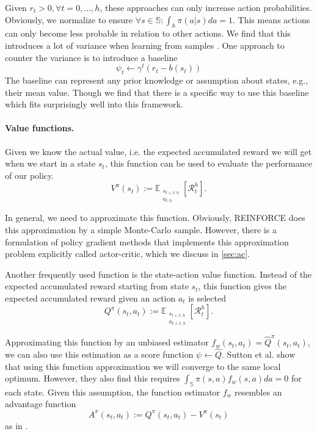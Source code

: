 Given $r_t > 0, \forall t=0,\dots,h$, these approaches can only increase action probabilities. 
Obviously, we normalize to ensure $\forall s \in \mathbb{S}: \int_\mathbb{A}{\pi(a|s)da} = 1$. 
This means actions can only become less probable in relation to other actions. 
We find that this introduces a lot of variance when learning from samples \cite{Sutton:1999:PGM:3009657.3009806}. 
One approach to counter the variance is to introduce a baseline
\begin{equation}
  \psi_t \leftarrow \gamma^{t} (r_{t} - b(s_t))
\end{equation}
The baseline can represent any prior knowledge or assumption about states, e.g., their mean value. 
Though we find that there is a specific way to use this baseline which fits surprisingly well into this framework.

\paragraph{Value functions.} 
Given we know the actual value, i.e. the expected accumulated reward we will get when we start in a state $s_t$, this function can be used to evaluate the performance of our policy.
\begin{equation}
	V^{\pi}(s_t) := \mathbb{E}_{\substack{s_{t+1:h} \\ a_{t:h}}}\left[\mathcal{R}_t^h\right].
	\label{eqn:v}
\end{equation}

In general, we need to approximate this function. 
Obviously, REINFORCE does this approximation by a simple Monte-Carlo sample. 
However, there is a formulation of policy gradient methods that implements this approximation problem explicitly called actor-critic, which we discuss in \ref{sec:ac}. 

Another frequently used function is the state-action value function. 
Instead of the expected accumulated reward starting from state $s_t$, this function gives the expected accumulated reward given an action $a_t$ is selected
\begin{equation}
	Q^{\pi}(s_t, a_t) := \mathbb{E}_{\substack{s_{t+1:h} \\ a_{t+1:h}}}\left[\mathcal{R}_t^h\right].
	\label{eqn:q}
\end{equation}

Approximating this function by an unbiased estimator $f_w(s_t, a_t) = \hat{Q}^\pi(s_t, a_t)$, we can also use this estimation as a score function $\psi \leftarrow \hat{Q}$. Sutton et al. \cite{Sutton:1999:PGM:3009657.3009806} show that using this function approximation we will converge to the same local optimum.
However, they also find this requires $\int_\mathbb{S}{\pi(s,a)f_w(s,a)da} = 0$ for each state. 
Given this assumption, the function estimator $f_w$ resembles an advantage function
\begin{equation}
	A^{\pi}(s_t, a_t) := Q^{\pi}(s_t, a_t) - V^{\pi}(s_t)
	\label{eqn:adv}
\end{equation}
as in \cite{1993b}.

